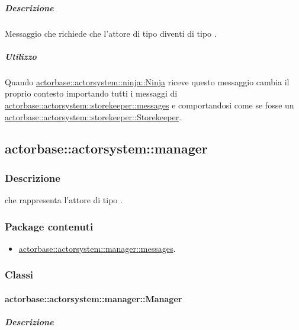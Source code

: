 \documentclass{scalatekids-article}
\begin{document}
\subparagraph{Descrizione}

Messaggio che richiede che l'attore di tipo  diventi di tipo
.

\subparagraph{Utilizzo}

Quando \hyperref[sec:actorbase::actorsystem::ninja::Ninja]{actorbase::actorsystem::ninja::Ninja}
riceve questo messaggio cambia il proprio contesto importando tutti i messaggi
di \hyperref[sec:actorbase::actorsystem::storekeeper::messages]{actorbase::\allowbreak{}actorsystem::\allowbreak{}storekeeper::\allowbreak{}messages}
e comportandosi come se fosse un \hyperref[sec:actorbase::actorsystem::storekeeper::Storekeeper]{actorbase::\allowbreak{}actorsystem::\allowbreak{}storekeeper::\allowbreak{}Storekeeper}.

\subsection{actorbase::actorsystem::manager}
\label{sec:actorbase::actorsystem::manager}

\subsubsection{Descrizione}

 che rappresenta l'attore di tipo .

\subsubsection{Package contenuti}

\begin{itemize}

\item \hyperref[sec:actorbase::actorsystem::manager::messages]{actorbase::actorsystem::manager::messages}.

\end{itemize}

\subsubsection{Classi}

\paragraph{actorbase::actorsystem::manager::Manager}
\label{sec:actorbase::actorsystem::manager::Manager}

\subparagraph{Descrizione}
\end{document}
